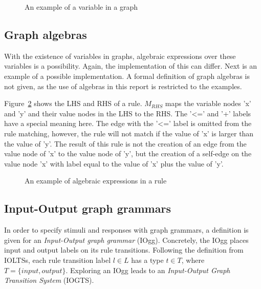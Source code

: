 \begin{figure}[ht]
  \begin{center}
    
  \end{center}
  \caption{An example of a variable in a graph}
  \label{fig:variable_node}
\end{figure}

\subsection{Graph algebras}
With the existence of variables in graphs, algebraic expressions over these variables is a possibility. Again, the implementation of this can differ. Next is an example of a possible implementation. A formal definition of graph algebras is not given, as the use of algebras in this report is restricted to the examples.

Figure~\ref{fig:algebra} shows the LHS and RHS of a rule. $\mathit{M_{RHS}}$ maps the variable nodes 'x' and 'y' and their value nodes in the LHS to the RHS. The '<=' and '+' labels have a special meaning here. The edge with the '<=' label is omitted from the rule matching, however, the rule will not match if the value of 'x' is larger than the value of 'y'. The result of this rule is not the creation of an edge from the value node of 'x' to the value node of 'y', but the creation of a self-edge on the value node 'x' with label equal to the value of 'x' plus the value of 'y'.  

\begin{figure}[ht]
  \begin{center}
    \hspace{20px}
  \end{center}
  \caption{An example of algebraic expressions in a rule}
  \label{fig:algebra}
\end{figure}

\subsection{Input-Output graph grammars}
In order to specify stimuli and responses with graph grammars, a definition is given for an \textit{Input-Output graph grammar} (IOgg). Concretely, the IOgg places input and output labels on its rule transitions. Following the definition from IOLTSs, each rule transition label $l \in L$ has a type $t \in T$, where $T = \{input, output\}$. Exploring an IOgg leads to an \textit{Input-Output Graph Transition System} (IOGTS).

